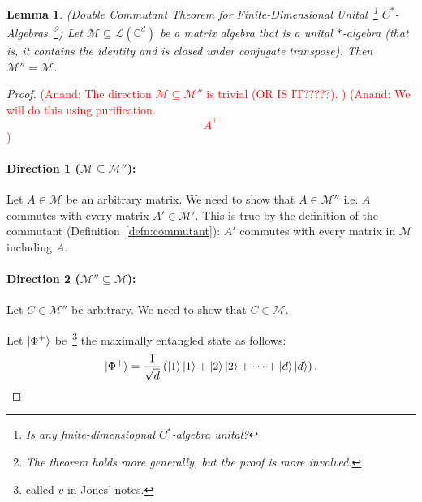 \documentclass[12pt]{article}
\theoremstyle{plain}
\newtheorem{lemma}[theorem]{Lemma}
\newcommand{\AnandNote}[1]{\textcolor{red}{(Anand: #1)}}
\newcommand{\AnandNote}[1]{}
\begin{document}
\begin{lemma}(Double Commutant Theorem for Finite-Dimensional Unital~\footnote{Is any finite-dimensiopnal $C^*$-algebra unital?} $C^*$-Algebras~\footnote{The theorem holds more generally, but the proof is more involved.})
    Let $\mathcal{M} \subseteq \mathcal{L}(\mathbb{C}^d)$ be a matrix algebra that is a unital $*$-algebra (that is, it contains the identity and is closed under conjugate transpose). Then $\mathcal{M}'' = \mathcal{M}$.
\end{lemma}
\begin{proof}

    \AnandNote{The direction $\mathcal{M} \subseteq \mathcal{M}''$ is trivial (OR IS IT?????). }
    \AnandNote{    We will do this using purification. 
    \[ A^\top\]}


    \paragraph{Direction 1 ($\mathcal{M} \subseteq \mathcal{M}''$):} 
    Let $A \in \mathcal{M}$ be an arbitrary matrix. We need to show that $A \in \mathcal{M}''$ i.e. $A$ commutes with every matrix $A' \in \mathcal{M}'$. This is true by the definition of the commutant (Definition~\ref{defn:commutant}): $A'$ commutes with every matrix in $\mathcal{M}$ including $A$.
    

    \paragraph{Direction 2 ($\mathcal{M}'' \subseteq \mathcal{M}$):} Let $C \in \mathcal{M}''$ be arbitrary. We need to show that $C \in \mathcal{M}$. 
    
Let $\ket{\Phi^+}$ be~\footnote{called $v$ in Jones' notes.} the maximally entangled state as follows:
\begin{equation}
    \ket{\Phi^+} = \frac{1}{\sqrt{d}} \left(\ket{1}\ket{1} + \ket{2}\ket{2} + \dots + \ket{d}\ket{d}\right).
\end{equation}


\end{proof}
\end{document}
